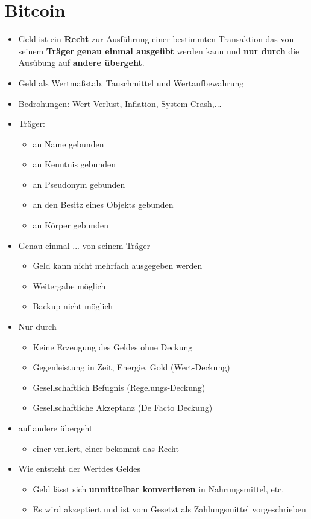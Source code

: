 \documentclass{article} %
\begin{document}
	\section{Bitcoin}
	\begin{itemize}
		\item \glqq Geld ist ein \textbf{Recht} zur Ausführung einer bestimmten Transaktion das von seinem \textbf{Träger} \textbf{genau einmal ausgeübt} werden kann und \textbf{nur durch} die Ausübung auf \textbf{andere übergeht}.\grqq
		\item Geld als Wertmaßstab, Tauschmittel und Wertaufbewahrung
		\item Bedrohungen: Wert-Verlust, Inflation, System-Crash,...
		\item \glqq Träger:\grqq
		\begin{itemize}
			\item an Name gebunden
			\item an Kenntnis gebunden
			\item an Pseudonym gebunden
			\item an den Besitz eines Objekts gebunden
			\item an Körper gebunden
		\end{itemize}
		\item \glqq Genau einmal ... von seinem Träger \grqq
		\begin{itemize}
			\item Geld kann nicht mehrfach ausgegeben werden
			\item Weitergabe möglich
			\item Backup nicht möglich
		\end{itemize}
		\item \glqq Nur durch\grqq
		\begin{itemize}
			\item Keine Erzeugung des Geldes ohne Deckung
			\item Gegenleistung in Zeit, Energie, Gold (Wert-Deckung)
			\item Gesellschaftlich Befugnis (Regelungs-Deckung)
			\item Gesellschaftliche Akzeptanz (De Facto Deckung)
		\end{itemize}
		\item \glqq auf andere übergeht\grqq
		\begin{itemize}
			\item einer verliert, einer bekommt das Recht
		\end{itemize}
		\item Wie entsteht der \glqq Wert\grqq des Geldes
		\begin{itemize}
			\item Geld lässt sich \textbf{unmittelbar konvertieren} in Nahrungsmittel, etc.
			\item Es wird akzeptiert und ist vom Gesetzt als Zahlungsmittel vorgeschrieben 
		\end{itemize}
	\end{itemize}
\end{document}
